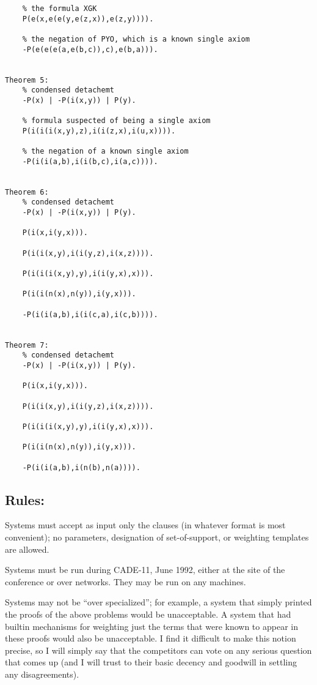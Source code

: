 \begin{verbatim}
    % the formula XGK
    P(e(x,e(e(y,e(z,x)),e(z,y)))).

    % the negation of PYO, which is a known single axiom
    -P(e(e(e(a,e(b,c)),c),e(b,a))).
  

Theorem 5:
    % condensed detachemt
    -P(x) | -P(i(x,y)) | P(y).
    
    % formula suspected of being a single axiom    
    P(i(i(i(x,y),z),i(i(z,x),i(u,x)))).

    % the negation of a known single axiom
    -P(i(i(a,b),i(i(b,c),i(a,c)))).


Theorem 6:
    % condensed detachemt
    -P(x) | -P(i(x,y)) | P(y).

    P(i(x,i(y,x))).

    P(i(i(x,y),i(i(y,z),i(x,z)))).

    P(i(i(i(x,y),y),i(i(y,x),x))).

    P(i(i(n(x),n(y)),i(y,x))).

    -P(i(i(a,b),i(i(c,a),i(c,b)))).


Theorem 7:
    % condensed detachemt
    -P(x) | -P(i(x,y)) | P(y).

    P(i(x,i(y,x))).

    P(i(i(x,y),i(i(y,z),i(x,z)))).

    P(i(i(i(x,y),y),i(i(y,x),x))).

    P(i(i(n(x),n(y)),i(y,x))).

    -P(i(i(a,b),i(n(b),n(a)))).
\end{verbatim}
  
\subsection*{Rules:}

Systems must accept as input only the clauses (in whatever format is most
convenient); no parameters, designation of set-of-support, or weighting
templates are allowed.

Systems must be run during CADE-11, June 1992, either at the site of
the conference or over networks.  They may be run on any machines.

Systems may not be ``over specialized''; for example, a system that
simply printed the proofs of the above problems would be unacceptable.
A system that had builtin mechanisms for weighting just the terms that
were known to appear in these proofs would also be unacceptable.  I
find it difficult to make this notion precise, so I will simply say
that the competitors can vote on any serious question that comes up
(and I will trust to their basic decency and goodwill in settling any
disagreements).

